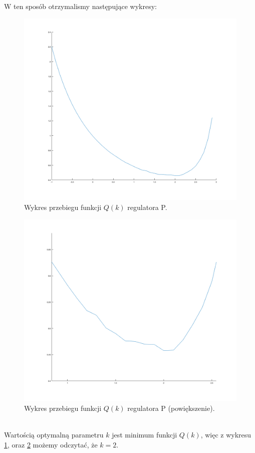 \documentclass[a4paper,10pt]{article}
\begin{document}
\newpage
W ten sposób otrzymalismy następujące wykresy: \\
\begin{figure}[!h]
    \centering
	\includegraphics[width=130mm]{P-opt.png}
	\caption{Wykres przebiegu funkcji $Q(k)$ regulatora P.}
    \label{fig:regulatorPopt1}
\end{figure}
\begin{figure}[!h]
    \centering
	\includegraphics[width=130mm]{P-opt-zoom.png}
	\caption{Wykres przebiegu funkcji $Q(k)$ regulatora P (powiększenie).}
    \label{fig:regulatorPopt2}
\end{figure}
\\ Wartością optymalną parametru $k$ jest minimum funkcji $Q(k)$, więc z wykresu \ref{fig:regulatorPopt1}, oraz \ref{fig:regulatorPopt2} możemy odczytać, że $k = 2$.
\end{document}
